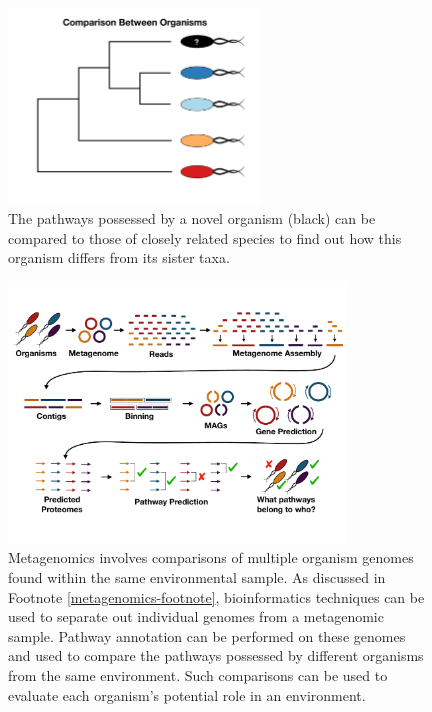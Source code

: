 \begin{figure}[!ht]
  \centering
	\includegraphics[width=0.6\textwidth]{media/compare-phylogenetically.pdf}
	 \caption{The pathways possessed by a novel organism (black) can be compared to those of closely related species to find out how this organism differs from its sister taxa.}
	 \label{fig:phylogenetic-comparison}
\end{figure}

\begin{figure}[!ht]
  \centering
	\includegraphics[width=0.8\textwidth]{media/metagenomics.pdf}
	 \caption{Metagenomics involves comparisons of multiple organism genomes found within the same environmental sample. As discussed in Footnote \ref{metagenomics-footnote}, bioinformatics techniques can be used to separate out individual genomes from a metagenomic sample. Pathway annotation can be performed on these genomes and used to compare the pathways possessed by different organisms from the same environment. Such comparisons can be used to evaluate each organism's potential role in an environment.}
	 \label{fig:metagenomics}
\end{figure}


